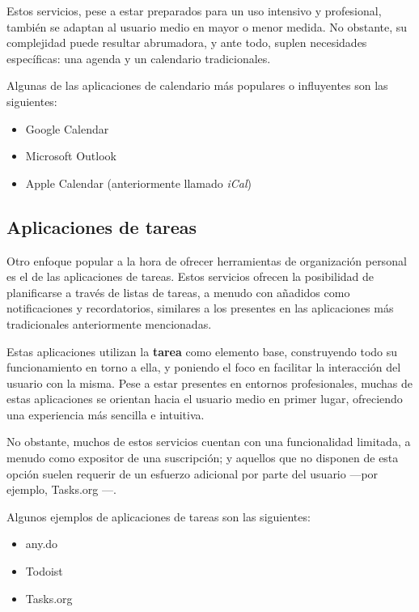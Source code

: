 \documentclass[10pt, a4paper]{aqademic}
\begin{document}
Estos servicios, pese a estar preparados para un uso intensivo y profesional, también se adaptan al usuario medio en mayor o menor medida. No obstante, su complejidad puede resultar abrumadora, y ante todo, suplen necesidades específicas: una agenda y un calendario tradicionales.

\medskip

Algunas de las aplicaciones de calendario más populares o influyentes son las siguientes:

\begin{itemize}
	\item Google Calendar
	\item Microsoft Outlook
	\item Apple Calendar (anteriormente llamado \textit{iCal})
\end{itemize}


\subsection*{Aplicaciones de tareas}

Otro enfoque popular a la hora de ofrecer herramientas de organización personal es el de las aplicaciones de tareas. Estos servicios ofrecen la posibilidad de planificarse a través de listas de tareas, a menudo con añadidos como notificaciones y recordatorios, similares a los presentes en las aplicaciones más tradicionales anteriormente mencionadas. 

\medskip

Estas aplicaciones utilizan la \textbf{tarea} como elemento base, construyendo todo su funcionamiento en torno a ella, y poniendo el foco en facilitar la interacción del usuario con la misma. Pese a estar presentes en entornos profesionales, muchas de estas aplicaciones se orientan hacia el usuario medio en primer lugar, ofreciendo una experiencia más sencilla e intuitiva.

\medskip

No obstante, muchos de estos servicios cuentan con una funcionalidad limitada, a menudo como expositor de una suscripción; y aquellos que no disponen de esta opción suelen requerir de un esfuerzo adicional por parte del usuario ---por ejemplo, Tasks.org \cite{tasks.org}---.

\medskip

Algunos ejemplos de aplicaciones de tareas son las siguientes:

\begin{itemize}
	\item any.do
	\item Todoist
	\item Tasks.org
\end{itemize}
\end{document}
